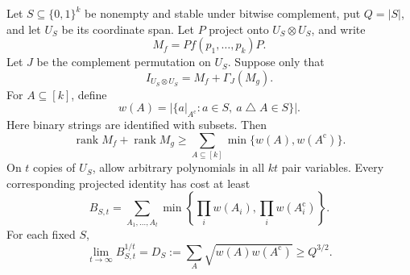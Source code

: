 \begin{theorem}
\label{thm:projected-pair-barrier}
Let \(S\subseteq\{0,1\}^k\) be nonempty and stable under bitwise
complement, put \(Q=|S|\), and let \(U_S\) be its coordinate span.
Let \(P\) project onto \(U_S\otimes U_S\), and write
\[
 M_f=P f(p_1,\ldots,p_k)P.
\]
Let \(J\) be the complement permutation on \(U_S\).
Suppose only that
\[
 I_{U_S\otimes U_S}=M_f+\Gamma_J(M_g).
\]
For \(A\subseteq[k]\), define
\[
 w(A)=\bigl|\{a|_{A^{\mathrm c}}:
          a\in S,\ a\mathbin{\triangle}A\in S\}\bigr|.
\]
Here binary strings are identified with subsets. Then
\begin{equation}\label{eq:projected-pair-finite}
 \operatorname{rank}M_f+\operatorname{rank}M_g
 \geq \sum_{A\subseteq[k]}\min\{w(A),w(A^{\mathrm c})\}.
\end{equation}
On \(t\) copies of \(U_S\), allow arbitrary polynomials in all \(kt\)
pair variables. Every corresponding projected identity has cost at least
\begin{equation}\label{eq:projected-pair-words}
 B_{S,t}=
 \sum_{A_1,\ldots,A_t}
 \min\left\{\prod_iw(A_i),\prod_iw(A_i^{\mathrm c})\right\}.
\end{equation}
For each fixed \(S\),
\begin{equation}\label{eq:projected-pair-rate}
 \lim_{t\to\infty}B_{S,t}^{1/t}
 =D_S:=\sum_A\sqrt{w(A)w(A^{\mathrm c})}
 \geq Q^{3/2}.
\end{equation}
\end{theorem}

